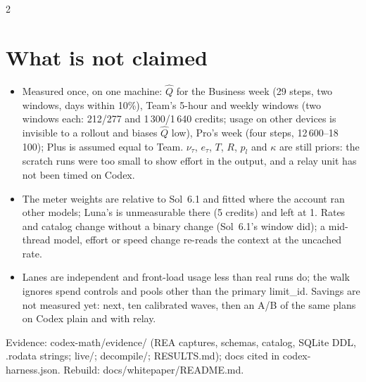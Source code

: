 \documentclass[9pt,a4paper]{extarticle}
\begin{document}
\begin{multicols}{2}
\section{What is not claimed}
\begin{itemize}
\item Measured once, on one machine: $\hat Q$ for the Business week (29 steps, two windows, days within 10\%), Team's 5-hour and weekly windows (two windows each: 212/277 and 1\,300/1\,640 credits; usage on other devices is invisible to a rollout and biases $\hat Q$ low), Pro's week (four steps, 12\,600--18\,100); Plus is assumed equal to Team. $\nu_\tau$, $e_\tau$, $T$, $R$, $p_l$ and $\kappa$ are still priors: the scratch runs were too small to show effort in the output, and a relay unit has not been timed on Codex.
\item The meter weights are relative to Sol~6.1 and fitted where the account ran other models; Luna's is unmeasurable there (5 credits) and left at 1. Rates and catalog change without a binary change (Sol~6.1's window did); a mid-thread model, effort or speed change re-reads the context at the uncached rate.
\item Lanes are independent and front-load usage less than real runs do; the walk ignores spend controls and pools other than the primary \textsf{limit\_id}. Savings are not measured yet: next, ten calibrated waves, then an A/B of the same plans on Codex plain and with relay.
\end{itemize}

{\scriptsize\color{ink2}
Evidence: \textsf{codex-math/evidence/} (REA captures, schemas, catalog, SQLite DDL, \textsf{.rodata} strings; \textsf{live/}; \textsf{decompile/}; \textsf{RESULTS.md}); docs cited in \textsf{codex-harness.json}. Rebuild: \textsf{docs/whitepaper/README.md}.\par}

\end{multicols}
\end{document}
